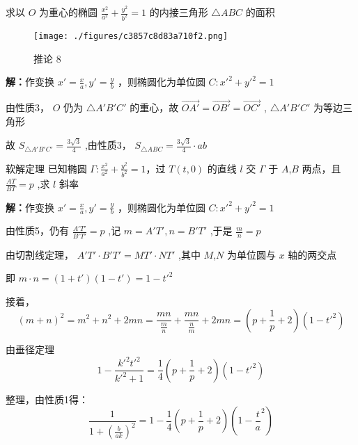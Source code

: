 \begin{corollary}{}
求以 $\displaystyle{O}$ 为重心的椭圆 $\displaystyle{\frac{x^2}{a^2}+\frac{y^2}{b^2}=1}$ 的内接三角形 $\displaystyle{\triangle ABC}$ 的面积
\begin{figure}[ht]
\centering
\texttt{[image: ./figures/c3857c8d83a710f2.png]}
\caption{推论 8} \label{fig_affine_7}
\end{figure}
\textbf{解：}作变换 $\displaystyle{x'=\frac{x}{a},y'=\frac{y}{b}}$ ，则椭圆化为单位圆 $\displaystyle{C:x'^2+y'^2=1}$

由性质3， $\displaystyle{O}$ 仍为 $\displaystyle{\triangle A'B'C'}$ 的重心，故 $\displaystyle{\vec{OA'}=\vec{OB'}=\vec{OC'}}$  , $\displaystyle{\triangle A'B'C'}$ 为等边三角形

故 $\displaystyle{S_{\triangle A'B'C'}=\frac{3\sqrt{3}}{4}}$ ,由性质3， $\displaystyle{S_{\triangle ABC}=\frac{3\sqrt{3}}{4}\cdot ab}$ 
\end{corollary}
\begin{corollary}{软解定理}
已知椭圆 $\displaystyle{\Gamma:\frac{x^2}{a^2}+\frac{y^2}{b^2}=1}$，过 $\displaystyle{T(t,0)}$ 的直线 $\displaystyle{l}$ 交 $\displaystyle{\Gamma}$ 于 $\displaystyle{A}$,$\displaystyle{B}$ 两点，且 $\displaystyle{\frac{AT}{BT}=p}$ ,求 $\displaystyle{l}$ 斜率

\textbf{解：}作变换 $\displaystyle{x'=\frac{x}{a},y'=\frac{y}{b}}$ ，则椭圆化为单位圆 $\displaystyle{C:x'^2+y'^2=1}$

由性质5，仍有 $\displaystyle{\frac{A'T'}{B'T'}=p}$ ,记 $\displaystyle{m=A'T',n=B'T'}$ ,于是 $\displaystyle{\frac{m}{n}=p}$ 

由切割线定理， $\displaystyle{A'T'\cdot B'T'=MT'\cdot NT'}$ ,其中 $\displaystyle{M}$,$\displaystyle{N}$ 为单位圆与 $\displaystyle{x}$ 轴的两交点

即 $\displaystyle{m\cdot n=(1+t')(1-t')=1-t'^2}$ 

接着，
$$(m+n)^2=m^2+n^2+2mn=\frac{mn}{\frac{m}{n}}+\frac{mn}{\frac{n}{m}}+2mn=\left(p+\frac{1}{p}+2\right)(1-t'^2)$$

由垂径定理
$$1-\frac{k'^2t'^2}{k'^2+1}=\frac{1}{4}\left(p+\frac{1}{p}+2\right)(1-t'^2)$$ 

整理，由性质1得：
$$\frac{1}{1+(\frac{b}{ak})^2}=1-\frac{1}{4}\left(p+\frac{1}{p}+2\right)\left(1-\frac{t}{a}^2\right)$$ 

\end{corollary}

